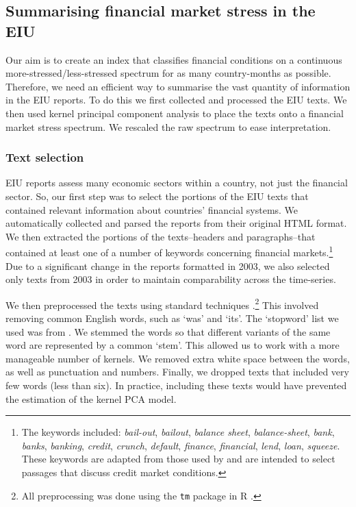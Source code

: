 \documentclass[]{article}
\begin{document}
\subsection{Summarising financial market stress in the
EIU}\label{summarizing-financial-market-stress-in-the-eiu}

Our aim is to create an index that classifies financial conditions on a continuous more-stressed/less-stressed spectrum for as many country-months as possible. Therefore, we need an efficient way to summarise the vast quantity of information in the EIU reports. To do this we first collected and processed the EIU texts. We then used kernel principal component analysis to place the texts onto a financial market stress spectrum. We rescaled the raw spectrum to ease interpretation.

\subsubsection{Text selection}\label{text-selection}

EIU reports assess many economic sectors within a country,
not just the financial sector. So, our first step was to select the portions of the EIU texts that contained relevant information about countries' financial systems. We automatically collected and parsed the reports from their original HTML format. We then extracted the portions of the texts--headers and paragraphs--that contained at least one of a number of keywords concerning financial markets.\footnote{The
  keywords included: \emph{bail-out}, \emph{bailout}, \emph{balance
  sheet}, \emph{balance-sheet}, \emph{bank}, \emph{banks},
  \emph{banking}, \emph{credit}, \emph{crunch}, \emph{default},
  \emph{finance}, \emph{financial}, \emph{lend}, \emph{loan},
  \emph{squeeze}. These keywords are adapted
  from those used by \cite{Romer2015} and are intended to
  select passages that discuss credit market conditions.} Due to a significant change in the reports formatted in 2003, we also
selected only texts from 2003 in order to maintain comparability across the time-series.

We then preprocessed the texts using standard techniques \citep[see][]{Grimmer2013}.\footnote{All preprocessing was done using the \texttt{tm} package \citep{tm2015} in R \citep{R-cite}.} This involved removing common English words, such as `was' and `its'. The `stopword' list we used was from \cite{dhillon:modha:mlj01}. We stemmed the words so that different variants of the same word are represented by a common `stem'. This allowed us to work with a more manageable number of kernels.  We removed extra white space between the words, as well as punctuation and numbers. Finally, we dropped texts that included very few words (less than six). In practice, including these texts would have prevented the estimation of the kernel PCA model.
\end{document}
